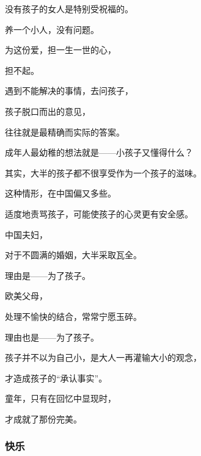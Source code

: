 \par 没有孩子的女人是特别受祝福的。
\par 养一个小人，没有问题。
\par 为这份爱，担一生一世的心，
\par 担不起。
\par 
\par 遇到不能解决的事情，去问孩子，
\par 孩子脱口而出的意见，
\par 往往就是最精确而实际的答案。
\par 
\par 成年人最幼稚的想法就是——小孩子又懂得什么？
\par 其实，大半的孩子都不很享受作为一个孩子的滋味。
\par 这种情形，在中国偏又多些。
\par 
\par 适度地责骂孩子，可能使孩子的心灵更有安全感。
\par 
\par 中国夫妇，
\par 对于不圆满的婚姻，大半采取瓦全。
\par 理由是——为了孩子。
\par 欧美父母，
\par 处理不愉快的结合，常常宁愿玉碎。
\par 理由也是——为了孩子。
\par 
\par 孩子并不以为自己小，是大人一再灌输大小的观念，
\par 才造成孩子的“承认事实”。
\par 
\par 童年，只有在回忆中显现时，
\par 才成就了那份完美。


\subsubsection{快乐}

